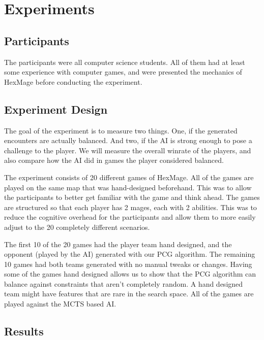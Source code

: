 \chapter{Experiments}
\label{chapter05}

\section{Participants}

The participants were all computer science students. All of them had at least
some experience with computer games, and were presented the mechanics of HexMage
before conducting the experiment.

\section{Experiment Design}

The goal of the experiment is to measure two things. One, if the generated
encounters are actually balanced. And two, if the AI is strong enough to pose a
challenge to the player. We will measure the overall winrate of the players,
and also compare how the AI did in games the player considered balanced.

The experiment consists of 20 different games of HexMage. All of the games are
played on the same map that was hand-designed beforehand. This was to allow the
participants to better get familiar with the game and think ahead. The games
are structured so that each player has 2 mages, each with 2 abilities. This was
to reduce the cognitive overhead for the participants and allow them to more easily
adjust to the 20 completely different scenarios.

The first 10 of the 20 games had the player team hand designed, and the
opponent (played by the AI) generated with our PCG algorithm. The remaining 10
games had both teams generated with no manual tweaks or changes. Having some of
the games hand designed allows us to show that the PCG algorithm can balance
against constraints that aren't completely random. A hand designed team might
have features that are rare in the search space. All of the games are played
against the MCTS based AI\@.

\section{Results}


